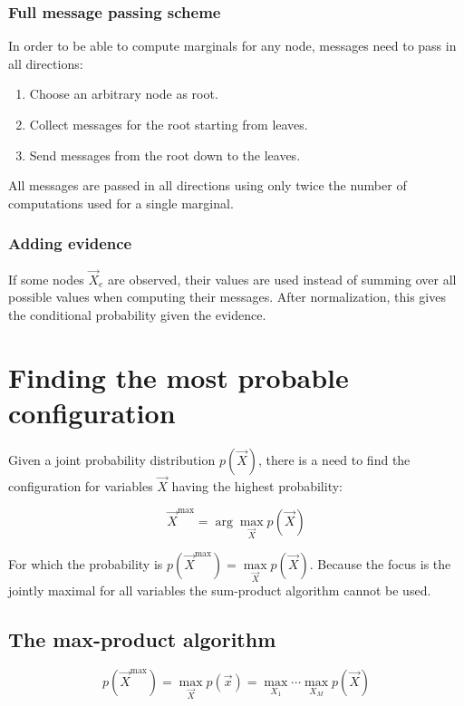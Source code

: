 		\subsubsection{Full message passing scheme}
		In order to be able to compute marginals for any node, messages need to pass in all directions:

		\begin{multicols}{2}
			\begin{enumerate}
				\item Choose an arbitrary node as root.
				\item Collect messages for the root starting from leaves.
				\item Send messages from the root down to the leaves.
			\end{enumerate}
		\end{multicols}

		All messages are passed in all directions using only twice the number of computations used for a single marginal.

		\subsubsection{Adding evidence}
    If some nodes $\vec{X}_e$ are observed, their values are used instead of summing over all possible values when computing their messages.
		After normalization, this gives the conditional probability given the evidence.

\section{Finding the most probable configuration}
Given a joint probability distribution $p(\vec{X})$, there is a need to find the configuration for variables $\vec{X}$ having the highest probability:

$$\vec{X}^{\max} = \arg\max\limits_{\vec{X}}p(\vec{X})$$

For which the probability is $p(\vec{X}^{\max}) = \max\limits_{\vec{X}}p(\vec{X})$.
Because the focus is the jointly maximal for all variables the sum-product algorithm cannot be used.

	\subsection{The max-product algorithm}

	$$p(\vec{X}^{\max}) = \max\limits_{\vec{X}}p(\vec{x}) = \max\limits_{X_1}\cdots\max\limits_{X_M}p(\vec{X})$$

